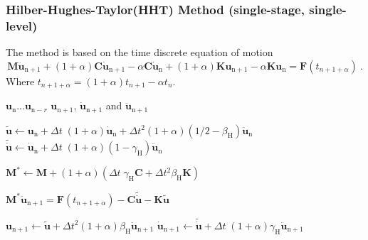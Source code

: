 \subsubsection[Hilber-Hughes-Taylor Method]{Hilber-Hughes-Taylor(HHT) Method (single-stage, single-level)}
The method is based on the time discrete equation of motion
\begin{equation}
\mathbf{M}\mathbf{\ddot{u}}_{\mathrm{n+1}} + (1+\alpha) \mathbf{C} \mathbf{\dot{u}}_{\mathrm{n+1}} - \alpha \mathbf{C}
\mathbf{\dot{u}}_{\mathrm{n}} + (1+\alpha) \mathbf{K} \mathbf{u}_{\mathrm{n+1}} - \alpha \mathbf{K} \mathbf{u}_{\mathrm{n}} =
\mathbf{F}(t_{n+1+\alpha})\ .
\end{equation}
Where $t_{n+1+\alpha} = (1+\alpha) t_{n+1} - \alpha t_n$.
\begin{algorithm}[hbt]
\caption{The Hilber-Hughes-Taylor Method (Effective Mass)} \label{alg:hhtmass}
\begin{algorithmic}
\REQUIRE $\mathbf{u}_{\mathrm{n}} ... \mathbf{u}_{\mathrm{n}-r}$
\ENSURE  $\mathbf{u}_{\mathrm{n}+1}$, $\mathbf{\dot{u}}_{\mathrm{n}+1}$ and $\mathbf{\ddot{u}}_{\mathrm{n}+1}$

\STATE{}
\STATE $\tilde{\mathbf{u}} \gets \mathbf{u}_{\mathrm{n}} + \Delta t\; (1+\alpha) \mathbf{\dot{u}}_{\mathrm{n}} + \Delta
t^2  (1+\alpha) (1/2 - \beta_\mathrm{H}) \mathbf{\ddot{u}}_{\mathrm{n}}$
\STATE $\mathbf{\tilde{\dot{u}}} \gets \mathbf{\dot{u}}_{\mathrm{n}} + \Delta t\; (1+\alpha) (1-\gamma_{\mathrm{H}}) \mathbf{\ddot{u}}_{\mathrm{n}}$

\STATE {}
\STATE $\mathbf{M}^* \gets \mathbf{M} + (1+\alpha) (\Delta t\; \gamma_\mathrm{H} \mathbf{C} + \Delta t^2
\beta_\mathrm{H} \mathbf{K})$

\STATE {}
\STATE $\mathbf{M}^* \mathbf{\ddot{u}}_{\mathrm{n+1}}= \mathbf{F}(t_{n+1+\alpha}) - \mathbf{C} \mathbf{\tilde{\dot{u}}} - \mathbf{K} \tilde{\mathbf{u}} $

\STATE {}
\STATE $\mathbf{u}_{\mathrm{n}+1} \gets \tilde{\mathbf{u}} + \Delta t^2 (1+\alpha) \beta_\mathrm{H}
\mathbf{\ddot{u}}_{\mathrm{n+1}}$
\STATE $\mathbf{\dot{u}}_{\mathrm{n}+1} \gets \mathbf{\tilde{\dot{u}}} + \Delta t\; (1+\alpha) \gamma_\mathrm{H}
\mathbf{\ddot{u}}_{\mathrm{n+1}}$
\end{algorithmic}
\end{algorithm}

